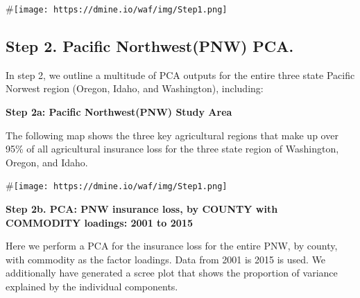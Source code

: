 \documentclass[]{article}
\begin{document}
\#\texttt{[image: https://dmine.io/waf/img/Step1.png]}

\hypertarget{step-2.-pacific-northwestpnw-pca.}{%
\subsection{Step 2. Pacific Northwest(PNW)
PCA.}\label{step-2.-pacific-northwestpnw-pca.}}

In step 2, we outline a multitude of PCA outputs for the entire three
state Pacific Norwest region (Oregon, Idaho, and Washington), including:

\textbf{Step 2a: Pacific Northwest(PNW) Study Area}

The following map shows the three key agricultural regions that make up
over 95\% of all agricultural insurance loss for the three state region
of Washington, Oregon, and Idaho.

\hypertarget{htmlwidget-8c455ea496ebbe36616e}{}

\#\texttt{[image: https://dmine.io/waf/img/Step1.png]}

\textbf{Step 2b. PCA: PNW insurance loss, by COUNTY with COMMODITY
loadings: 2001 to 2015}

Here we perform a PCA for the insurance loss for the entire PNW, by
county, with commodity as the factor loadings. Data from 2001 is 2015 is
used. We additionally have generated a scree plot that shows the
proportion of variance explained by the individual components.
\end{document}
